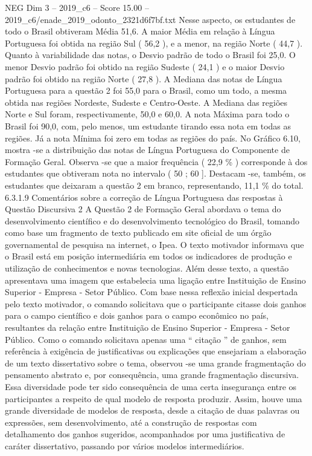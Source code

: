 \begin{textsample}{NEG Dim 3 – 2019\_c6 – Score 15.00 – 2019\_c6/enade\_2019\_odonto\_2321d6f7bf.txt}
Nesse aspecto, os estudantes de todo o Brasil obtiveram Média 51,6.
A maior Média em relação à Língua Portuguesa foi obtida na região Sul ( 56,2 ), e a menor, na região Norte ( 44,7 ).
Quanto à variabilidade das notas, o Desvio padrão de todo o Brasil foi 25,0.
O menor Desvio padrão foi obtido na região Sudeste ( 24,1 ) e o maior Desvio padrão foi obtido na região Norte ( 27,8 ).
A Mediana das notas de Língua Portuguesa para a questão 2 foi 55,0 para o Brasil, como um todo, a mesma obtida nas regiões Nordeste, Sudeste e Centro-Oeste.
A Mediana das regiões Norte e Sul foram, respectivamente, 50,0 e 60,0.
A nota Máxima para todo o Brasil foi 90,0, com, pelo menos, um estudante tirando essa nota em todas as regiões.
Já a nota Mínima foi zero em todas as regiões do país.
No Gráfico 6.10, mostra -se a distribuição das notas de Língua Portuguesa do Componente de Formação Geral.
Observa -se que a maior frequência ( 22,9 \% ) corresponde à dos estudantes que obtiveram nota no intervalo ( 50 ; 60 ].
Destacam -se, também, os estudantes que deixaram a questão 2 em branco, representando, 11,1 \% do total. 6.3.1.9 Comentários sobre a correção de Língua Portuguesa das respostas à Questão Discursiva 2 A Questão 2 de Formação Geral abordava o tema do desenvolvimento científico e do desenvolvimento tecnológico do Brasil, tomando como base um fragmento de texto publicado em site oficial de um órgão governamental de pesquisa na internet, o Ipea.
O texto motivador informava que o Brasil está em posição intermediária em todos os indicadores de produção e utilização de conhecimentos e novas tecnologias.
Além desse texto, a questão apresentava uma imagem que estabelecia uma ligação entre Instituição de Ensino Superior - Empresa - Setor Público.
Com base nessa reflexão inicial despertada pelo texto motivador, o comando solicitava que o participante citasse dois ganhos para o campo científico e dois ganhos para o campo econômico no país, resultantes da relação entre Instituição de Ensino Superior - Empresa - Setor Público.
Como o comando solicitava apenas uma “ citação ” de ganhos, sem referência à exigência de justificativas ou explicações que ensejariam a elaboração de um texto dissertativo sobre o tema, observou -se uma grande fragmentação do pensamento abstrato e, por consequência, uma grande fragmentação discursiva.
Essa diversidade pode ter sido consequência de uma certa insegurança entre os participantes a respeito de qual modelo de resposta produzir.
Assim, houve uma grande diversidade de modelos de resposta, desde a citação de duas palavras ou expressões, sem desenvolvimento, até a construção de respostas com detalhamento dos ganhos sugeridos, acompanhados por uma justificativa de caráter dissertativo, passando por vários modelos intermediários.

\end{textsample}
